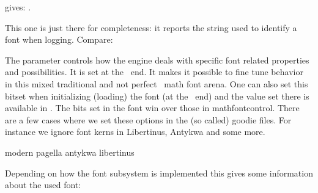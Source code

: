 \typebuffer

gives: \inlinebuffer.

\stopnewprimitive

\startnewprimitive[title={\prm {fontidentifier}}]

This one is just there for completeness: it reports the string used to identify a
font when logging. Compare:

\starttabulate
\NC \type {\fontname      \font} \NC \fontname      \font \NC \NR
\NC \type {\fontidentifier\font} \NC \fontidentifier\font \NC \NR
\NC \type {\the\fontid    \font} \NC \the\fontid    \font \NC \NR
\stoptabulate

\stopnewprimitive

\startnewprimitive[title={\prm {fontmathcontrol}}]

The  parameter controls how the engine deals with specific
font related properties and possibilities. It is set at the \TEX\ end. It makes
it possible to fine tune behavior in this mixed traditional and not perfect
\OPENTYPE\ math font arena. One can also set this bitset when initializing
(loading) the font (at the \LUA\ end) and the value set there is available in
. The bits set in the font win over those in \prm
{mathfontcontrol}. There are a few cases where we set these options in the (so
called) goodie files. For instance we ignore font kerns in Libertinus, Antykwa
and some more.

\starttabulate[|l|rT|]
\NC modern     \NC \bgroup\switchtobodyfont    [modern] \NC \NR
\NC pagella    \NC \bgroup\switchtobodyfont   [pagella] \NC \NR
\NC antykwa    \NC \bgroup\switchtobodyfont   [antykwa] \NC \NR
\NC libertinus \NC \bgroup\switchtobodyfont[libertinus] \NC \NR
\stoptabulate

\stopnewprimitive

\startoldprimitive[title={\prm {fontname}}]

Depending on how the font subsystem is implemented this gives some information
about the used font:

\startbuffer
{\tf \fontname\font}
{\bf \fontname\font}
{\sl \fontname\font}
\stopbuffer

\typebuffer

\startlines
\getbuffer
\stoplines

